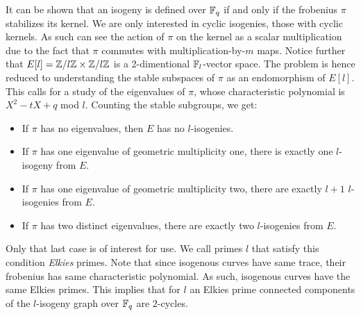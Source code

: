 \documentclass[../main/main.tex]{subfiles}
\begin{document}
It can be shown that an isogeny is defined over $\mathbb{F}_q$ if and only if the frobenius $\pi$ stabilizes its kernel.
We are only interested in cyclic isogenies, those with cyclic kernels.
As such can see the action of $\pi$ on the kernel as a scalar multiplication due to the fact that $\pi$ commutes with multiplication-by-$m$ maps.
Notice further that $E[l] = \mathbb{Z}/l\mathbb{Z}\times\mathbb{Z}/l\mathbb{Z}$ is a 2-dimentional $\mathbb{F}_l$-vector space.
The problem is hence reduced to understanding the stable subspaces of $\pi$ as an endomorphism of $E[l]$.
This calls for a study of the eigenvalues of $\pi$, whose characteristic polynomial is $X^2-tX+q$ mod $l$.
Counting the stable subgroups, we get:
\begin{itemize}
	  \item If $\pi$ has no eigenvalues, then $E$ has no $l$-isogenies.
	  \item If $\pi$ has one eigenvalue of geometric multiplicity one, there is exactly one $l$-isogeny from $E$.
	  \item If $\pi$ has one eigenvalue of geometric multiplicity two, there are exactly $l+1$ $l$-isogenies from $E$.
	  \item If $\pi$ has two distinct eigenvalues, there are exactly two $l$-isogenies from $E$.
\end{itemize}
Only that last case is of interest for use.
We call primes $l$ that satisfy this condition \textit{Elkies} primes.
Note that since isogenous curves have same trace, their frobenius has same characteristic polynomial.
As such, isogenous curves have the same Elkies primes.
This implies that for $l$ an Elkies prime connected components of the $l$-isogeny graph over $\mathbb{F}_q$ are $2$-cycles.
\end{document}
